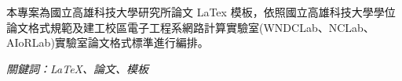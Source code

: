 \renewcommand{\abstractname}{摘要}
\clearpage
{}
\addchaptertocentry{\abstractname}
\begin{cntabstract}
\n 本專案為國立高雄科技大學研究所論文 LaTex 模板，依照國立高雄科技大學學位論文格式規範及建工校區電子工程系網路計算實驗室(WNDCLab、NCLab、AIoRLab)實驗室論文格式標準進行編排。

\hbox{}
\it 關鍵詞：LaTeX、論文、模板
\end{cntabstract}